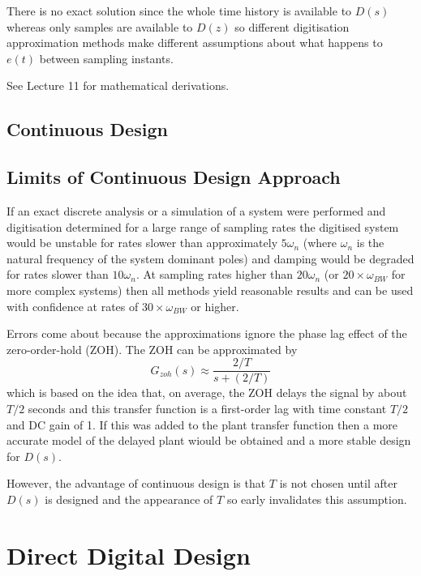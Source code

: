 There is no exact solution since the whole time history is available to $D(s)$ whereas only samples are available to $D(z)$ so different digitisation approximation methods make different assumptions about what happens to $e(t)$ between sampling instants.

\begin{slide}
	See Lecture 11 for mathematical derivations.
\end{slide}


\subsection*{Continuous Design}

\subsection*{Limits of Continuous Design Approach}

If an exact discrete analysis or a simulation of a system were performed and digitisation determined for a large range of sampling rates the digitised system would be unstable for rates slower than approximately $5\omega_n$ (where $\omega_n$ is the natural frequency of the system dominant poles) and damping would be degraded for rates slower than $10\omega_n$. At sampling rates higher than $20\omega_n$ (or $20\times \omega_{BW}$ for more complex systems) then all methods yield reasonable results and can be used with confidence at rates of $30\times \omega_{BW}$ or higher.

Errors come about because the approximations ignore the phase lag effect of the zero-order-hold (ZOH). The ZOH can be approximated by $$G_{zoh}(s)\approx \frac{2/T}{s+(2/T)}$$ which is based on the idea that, on average, the ZOH delays the signal by about $T/2$ seconds and this transfer function is a first-order lag with time constant $T/2$ and DC gain of 1. If this was added to the plant transfer function then a more accurate model of the delayed plant wiould be obtained and a more stable design for $D(s)$.

However, the advantage of continuous design is that $T$ is not chosen until after $D(s)$ is designed and the appearance of $T$ so early invalidates this assumption.

\section*{Direct Digital Design}

\endinput

